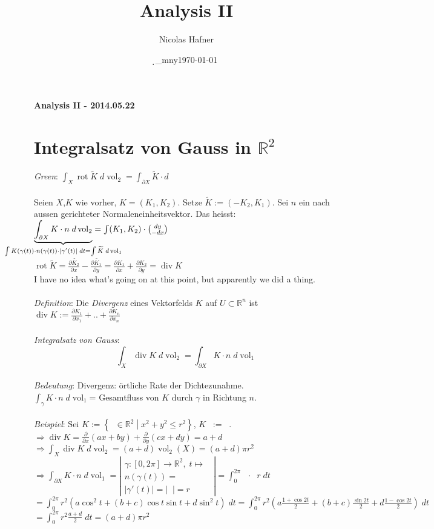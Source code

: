 \documentclass[12pt,a4paper,titlepage]{article}
\author{Nicolas Hafner}
\title{Analysis II}
\date{\d_mny\today}
\renewcommand{\d}{\partial}
\newcommand{\setR}{\mathbb{R}}
\newcommand{\vol}{\operatorname{vol}}
\newcommand{\rot}{\operatorname{rot}}
\newcommand{\divv}{\operatorname{div}}
\newcommand{\twovec}[2]{\mathop{\left(\substack{#1 \\ #2}\right)}}
\begin{document}
	
\begin{center}{\bfseries\Huge Analysis II - 2014.05.22}\end{center}
\section*{Integralsatz von Gauss in $\setR^2$}
\textit{Green}: $\int_X\rot \widetilde{K} \;d\vol_2=\int_{\d X}\widetilde{K}\cdot d\twovec{x}{y}$ \\
\\
Seien $X$,$K$ wie vorher, $K=(K_1,K_2)$. Setze $\widetilde{K}:=(-K_2,K_1)$. Sei $n$ ein nach aussen gerichteter Normaleneinheitsvektor. Das heisst: $\underbrace{\int_{\d X}K\cdot n\;d\vol_2}_{\mathclap{\int K(\gamma(t))\cdot n(\gamma(t))\cdot|\gamma'(t)| \;dt = \int\widetilde{K}\;d\vol_1}} = \int(K_1,K_2)\cdot\twovec{dy}{-dx}$ \\
$\rot\widetilde{K}=\frac{\d\widetilde{K_2}}{\d x}-\frac{\d\widetilde{K_1}}{\d y}=\frac{\d K_1}{\d x}+\frac{\d K_2}{\d y} = \divv K$ \\
I have no idea what's going on at this point, but apparently we did a thing. \\
\\
\textit{Definition}: Die \emph{Divergenz} eines Vektorfelds $K$ auf $U\subset\setR^n$ ist $\divv K:=\frac{\d K_1}{\d x_1}+..+\frac{\d K_n}{\d x_n}$ \\
\\
\textit{Integralsatz von Gauss}:
$$\int_X\divv K \;d\vol_2=\int_{\d X}K\cdot n \;d\vol_1$$ \\
\textit{Bedeutung}: Divergenz: örtliche Rate der Dichtezunahme. \\
$\int_\gamma K\cdot n \;d\vol_1$= Gesamtfluss von $K$ durch $\gamma$ in Richtung $n$. \\
\\
\textit{Beispiel}: Sei $K:=\left\{\twovec{x}{y}\in\setR^2\middle| x^2+y^2\leq r^2\right\}$, $K\twovec{x}{y}:=\twovec{ax+by}{ex+dy}$. \\
$\Rightarrow \divv K=\frac{\d}{\d x}(ax+by)+\frac{\d}{\d y}(cx+dy)=a+d$ \\
$\Rightarrow \int_X\divv K \;d\vol_2=(a+d)\vol_2(X)=(a+d)\pi r^2$ \\
$\Rightarrow \int_{\d X}K\cdot n \;d\vol_1=\left|\substack{\gamma:[0,2\pi]\to\setR^2,\;t\mapsto\twovec{r\cos t}{r\sin t} \\ n(\gamma(t))=\twovec{\cos t}{\sin t} \\ |\gamma'(t)|=|\twovec{-r\sin t}{r\cos t}|=r}\right| = \int_0^{2\pi}\twovec{ar\cos t+br\sin t}{cr\cos t+dr\sin t}\cdot\twovec{\cos t}{\sin t}r \;dt$\\
$= \int_0^{2\pi}r^2(a\cos^2t+(b+c)\cos t\sin t+d\sin^2t) \;dt = \int_0^{2\pi}r^2(a\frac{1+\cos2t}{2}+(b+c)\frac{\sin2t}{2}+d\frac{1-\cos2t}{2}) \;dt$ \\
$=\int_0^{2\pi}r^2\frac{a+d}{2} \;dt = (a+d)\pi r^2$
\end{document}
